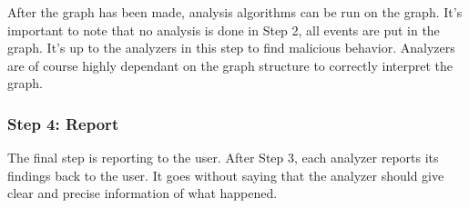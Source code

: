 After the graph has been made, analysis algorithms can be run on the graph. It's important to note that no analysis is done in Step 2, all events are put in the graph. It's up to the analyzers in this step to find malicious behavior. Analyzers are of course highly dependant on the graph structure to correctly interpret the graph.\\


\subsubsection{Step 4: Report}

The final step is reporting to the user. After Step 3, each analyzer reports its findings back to the user. It goes without saying that the analyzer should give clear and precise information of what happened.
